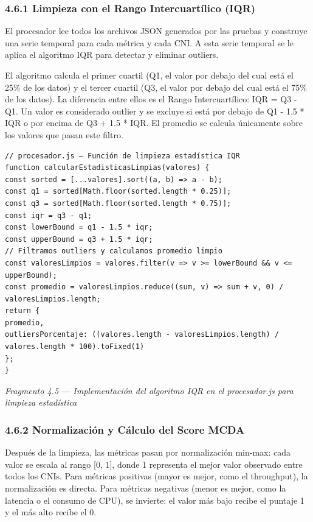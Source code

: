 \documentclass[journal]{IEEEtran}
\begin{document}
\subsubsection{4.6.1 Limpieza con el Rango Intercuartílico (IQR)}

El procesador lee todos los archivos JSON generados por las pruebas y construye una serie temporal para cada métrica y cada CNI. A esta serie temporal se le aplica el algoritmo IQR para detectar y eliminar outliers.

El algoritmo calcula el primer cuartil (Q1, el valor por debajo del cual está el 25\% de los datos) y el tercer cuartil (Q3, el valor por debajo del cual está el 75\% de los datos). La diferencia entre ellos es el Rango Intercuartílico: IQR = Q3 - Q1. Un valor es considerado outlier y se excluye si está por debajo de Q1 - 1.5 * IQR o por encima de Q3 + 1.5 * IQR. El promedio se calcula únicamente sobre los valores que pasan este filtro.

\begin{lstlisting}[basicstyle=\ttfamily\scriptsize,breaklines=true]
// procesador.js — Función de limpieza estadística IQR
function calcularEstadisticasLimpias(valores) {
const sorted = [...valores].sort((a, b) => a - b);
const q1 = sorted[Math.floor(sorted.length * 0.25)];
const q3 = sorted[Math.floor(sorted.length * 0.75)];
const iqr = q3 - q1;
const lowerBound = q1 - 1.5 * iqr;
const upperBound = q3 + 1.5 * iqr;
// Filtramos outliers y calculamos promedio limpio
const valoresLimpios = valores.filter(v => v >= lowerBound && v <= upperBound);
const promedio = valoresLimpios.reduce((sum, v) => sum + v, 0) / valoresLimpios.length;
return {
promedio,
outliersPorcentaje: ((valores.length - valoresLimpios.length) / valores.length * 100).toFixed(1)
};
}
\end{lstlisting}

\begin{center}\emph{\emph{Fragmento 4.5 --- Implementación del algoritmo IQR en el procesador.js para limpieza estadística}}\end{center}

\subsubsection{4.6.2 Normalización y Cálculo del Score MCDA}

Después de la limpieza, las métricas pasan por normalización min-max: cada valor se escala al rango [0, 1], donde 1 representa el mejor valor observado entre todos los CNIs. Para métricas positivas (mayor es mejor, como el throughput), la normalización es directa. Para métricas negativas (menor es mejor, como la latencia o el consumo de CPU), se invierte: el valor más bajo recibe el puntaje 1 y el más alto recibe el 0.
\end{document}
